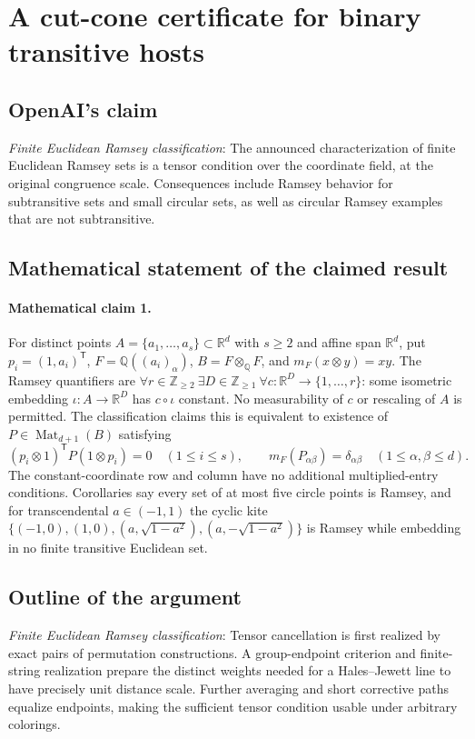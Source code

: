 \documentclass[11pt]{article}
\begin{document}
\section*{A cut-cone certificate for binary transitive hosts}

\subsection{OpenAI's claim}
\textit{Finite Euclidean Ramsey classification}: The announced characterization of finite Euclidean Ramsey sets is a tensor condition over the coordinate field, at the original congruence scale. Consequences include Ramsey behavior for subtransitive sets and small circular sets, as well as circular Ramsey examples that are not subtransitive.

\subsection{Mathematical statement of the claimed result}
\paragraph{Mathematical claim 1.} For distinct points $A=\{a_1,\ldots,a_s\}\subset\mathbb R^d$ with $s\ge2$ and affine span $\mathbb R^d$, put $p_i=(1,a_i)^{\mathsf T}$, $F=\mathbb Q((a_i)_\alpha)$, $B=F\otimes_{\mathbb Q}F$, and $m_F(x\otimes y)=xy$. The Ramsey quantifiers are $\forall r\in\mathbb Z_{\ge2}\ \exists D\in\mathbb Z_{\ge1}\ \forall c:\mathbb R^D\to\{1,\ldots,r\}$: some isometric embedding $\iota:A\to\mathbb R^D$ has $c\circ\iota$ constant. No measurability of $c$ or rescaling of $A$ is permitted. The classification claims this is equivalent to existence of $P\in\operatorname{Mat}_{d+1}(B)$ satisfying \[(p_i\otimes1)^{\mathsf T}P(1\otimes p_i)=0\quad(1\le i\le s),\qquad m_F(P_{\alpha\beta})=\delta_{\alpha\beta}\quad(1\le\alpha,\beta\le d).\] The constant-coordinate row and column have no additional multiplied-entry conditions. Corollaries say every set of at most five circle points is Ramsey, and for transcendental $a\in(-1,1)$ the cyclic kite $\{(-1,0),(1,0),(a,\sqrt{1-a^2}),(a,-\sqrt{1-a^2})\}$ is Ramsey while embedding in no finite transitive Euclidean set.

\subsection{Outline of the argument}
\textit{Finite Euclidean Ramsey classification}: Tensor cancellation is first realized by exact pairs of permutation constructions. A group-endpoint criterion and finite-string realization prepare the distinct weights needed for a Hales--Jewett line to have precisely unit distance scale. Further averaging and short corrective paths equalize endpoints, making the sufficient tensor condition usable under arbitrary colorings.
\end{document}

